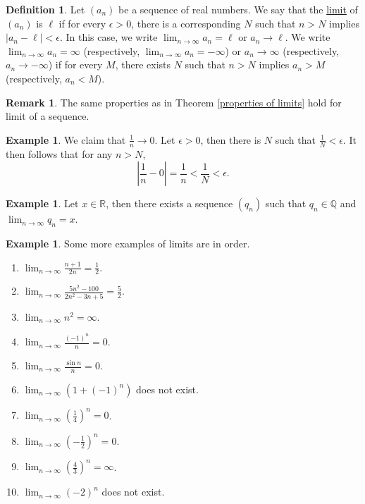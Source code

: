 \documentclass[12pt,letterpaper]{book}
\numberwithin{equation}{section}
\theoremstyle{definition}
\newtheorem{defi}[thm]{\textbf{Definition}}
\newtheorem{example}[thm]{\textbf{Example}}
\newtheorem{remark}[thm]{\textbf{Remark}}
\begin{document}
\begin{defi}
Let $(a_n)$ be a sequence of real numbers. We say that the \underline{limit} of $(a_n)$ is $\ell$ if for every $\epsilon>0$, there is a corresponding $N$ such that $n>N$ implies $|a_n-\ell|<\epsilon$. In this case, we write $\displaystyle{\lim_{n\to \infty} a_n=\ell}$ or $a_n \to \ell$. We write $\displaystyle{\lim_{n\to \infty} a_n=\infty}$ (respectively, $\displaystyle{\lim_{n\to \infty} a_n=-\infty}$) or $a_n \to \infty$ (respectively, $a_n\to -\infty$) if for every $M$, there exists $N$ such that $n>N$ implies $a_n>M$ (respectively, $a_n<M$).
\end{defi}

\begin{remark}
The same properties as in Theorem \ref{properties of limits} hold for limit of a sequence.
\end{remark}

\begin{example}
We claim that $\frac{1}{n}\to 0$. Let $\epsilon>0$, then there is $N$ such that $\frac{1}{N}<\epsilon$. It then follows that for any $n>N$,
$$\left|\frac{1}{n}-0\right|=\frac{1}{n}<\frac{1}{N}<\epsilon.$$
\end{example}

\begin{example}\label{Q dense}
Let $x\in \mathbb{R}$, then there exists a sequence $(q_n)$ such that $q_n\in \mathbb{Q}$ and $\displaystyle{\lim_{n\to \infty} q_n =x}$.
\end{example}

\begin{example} Some more examples of limits are in order.
\begin{multicols}{2}
\begin{enumerate}
\item $\displaystyle{\lim_{n\to\infty}}\frac{n+1}{2n}=\frac{1}{2}$.
\item $\displaystyle{\lim_{n\to\infty}}\frac{5n^2-100}{2n^2-3n+5}=\frac{5}{2}$.
\item $\displaystyle{\lim_{n\to\infty}}n^2=\infty$.
\item $\displaystyle{\lim_{n\to\infty}}\frac{(-1)^n}{n}=0$.
\item $\displaystyle{\lim_{n\to\infty}}\frac{\sin n}{n}=0$.
\item $\displaystyle{\lim_{n\to\infty}}(1+(-1)^n)$ does not exist.
\item $\displaystyle{\lim_{n\to\infty}}\left(\frac{1}{4}\right)^n=0$.
\item $\displaystyle{\lim_{n\to\infty}}\left(-\frac{1}{2}\right)^n=0$.
\item $\displaystyle{\lim_{n\to\infty}}\left(\frac{4}{3}\right)^n=\infty$.
\item $\displaystyle{\lim_{n\to\infty}}\left(-2\right)^n$ does not exist.
\end{enumerate}
\end{multicols}
\end{example}
\end{document}
